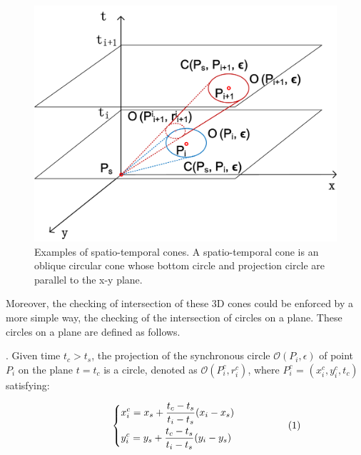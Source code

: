 \begin{figure}[tb!]
\centering
\includegraphics[scale=0.6]{figures/Fig-cis.png}
\caption{\small Examples of spatio-temporal cones. A spatio-temporal cone is an oblique circular cone whose bottom circle and projection circle are parallel to the x-y plane. }
\vspace{-2ex}
\label{fig:cis}
\end{figure}

Moreover, the checking of intersection of these 3D cones could be enforced by a more simple way, \ie the checking of the intersection of circles on a plane. These circles on a plane are defined as follows.

. Given time $t_c > t_s$, the projection of the synchronous circle $\mathcal{O}(P_i, \epsilon)$ of point $P_i$ on the plane $t=t_c$ is a circle, denoted as $\mathcal{O}(P^c_i, r^c_i)$, where $P^c_i$ =  $(x^c_i, y^c_i, t_c)$ satisfying:


\vspace{-1ex}
\begin{equation*}
\label{equ-proj-circle-xy}
\hspace{10ex} \left\{
    \begin{aligned}
        & x^c_i = x_s +  \frac{t_c - t_s}{t_i - t_s}(x_i - x_s) \\
        & y^c_i = y_s +  \frac{t_c - t_s}{t_i - t_s}(y_i - y_s) \\
    \end{aligned}
    \right.       \hspace{12ex}(1)
\end{equation*}
\vspace{-1ex}

